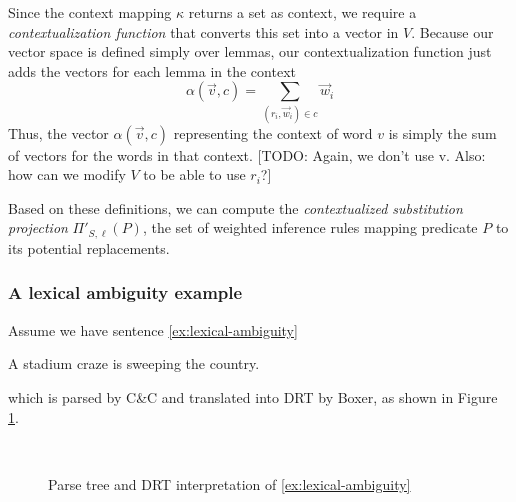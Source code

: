 Since the context mapping $\kappa$ returns a set as context, we require a
\textit{contextualization function} that converts this set into a vector in $V$.
Because our vector space is defined simply over lemmas, our contextualization
function just adds the vectors for each lemma in the context \[ \alpha(\vec v,
c) = \sum_{(r_i, \vec w_i) \in c} \vec w_i \]  Thus, the vector $\alpha(\vec v,
c)$ representing the context of word $v$ is simply the sum of vectors for the
words in that context.
[TODO: Again, we don't use \vec v.  Also: how can we modify $V$ to be able to
use $r_i$?]

Based on these definitions, we can compute the \textit{contextualized
substitution projection} $\Pi'_{S, \ell}(P)$, the set of weighted inference
rules mapping predicate $P$ to its potential replacements.


\subsubsection*{A lexical ambiguity example}

Assume we have sentence \eqref{ex:lexical-ambiguity}

\begin{example}\label{ex:lexical-ambiguity}
  A stadium craze is sweeping the country.
\end{example}

which is parsed by C\&C and translated into DRT by Boxer, as shown in Figure
\ref{drs:lexical-ambiguity}.

\begin{figure}
  \centering
  ~~~~~~~~~
  \caption{Parse tree and DRT interpretation of \eqref{ex:lexical-ambiguity}}
  \label{drs:lexical-ambiguity}
\end{figure}

